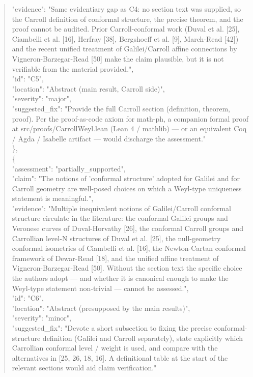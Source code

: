 \documentclass[11pt]{article}
\begin{document}
\begin{quote}
      "evidence": "Same evidentiary gap as C4: no section text was supplied, so the Carroll definition of conformal structure, the precise theorem, and the proof cannot be audited. Prior Carroll-conformal work (Duval et al. [25], Ciambelli et al. [16], Herfray [38], Bergshoeff et al. [9], March-Read [42]) and the recent unified treatment of Galilei/Carroll affine connections by Vigneron-Barzegar-Read [50] make the claim plausible, but it is not verifiable from the material provided.",\\
      "id": "C5",\\
      "location": "Abstract (main result, Carroll side)",\\
      "severity": "major",\\
      "suggested\_fix": "Provide the full Carroll section (definition, theorem, proof). Per the proof-as-code axiom for math-ph, a companion formal proof at src/proofs/CarrollWeyl.lean (Lean 4 / mathlib) — or an equivalent Coq / Agda / Isabelle artifact — would discharge the assessment."\\
    \},\\
    \{\\
      "assessment": "partially\_supported",\\
      "claim": "The notions of 'conformal structure' adopted for Galilei and for Carroll geometry are well-posed choices on which a Weyl-type uniqueness statement is meaningful.",\\
      "evidence": "Multiple inequivalent notions of Galilei/Carroll conformal structure circulate in the literature: the conformal Galilei groups and Veronese curves of Duval-Horvathy [26], the conformal Carroll groups and Carrollian level-N structures of Duval et al. [25], the null-geometry conformal isometries of Ciambelli et al. [16], the Newton-Cartan conformal framework of Dewar-Read [18], and the unified affine treatment of Vigneron-Barzegar-Read [50]. Without the section text the specific choice the authors adopt — and whether it is canonical enough to make the Weyl-type statement non-trivial — cannot be assessed.",\\
      "id": "C6",\\
      "location": "Abstract (presupposed by the main results)",\\
      "severity": "minor",\\
      "suggested\_fix": "Devote a short subsection to fixing the precise conformal-structure definition (Galilei and Carroll separately), state explicitly which Carrollian conformal level / weight is used, and compare with the alternatives in [25, 26, 18, 16]. A definitional table at the start of the relevant sections would aid claim verification."\\

\end{quote}
\end{document}
